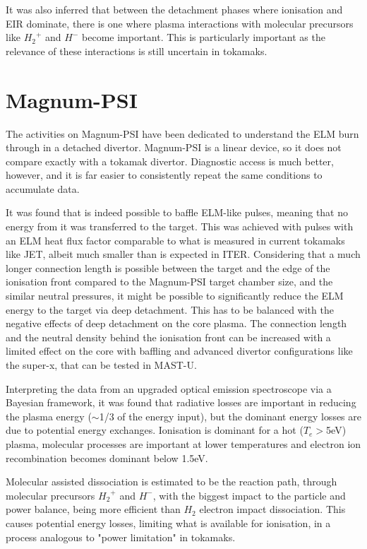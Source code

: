 It was also inferred that between the detachment phases where ionisation and EIR dominate, there is one where plasma interactions with molecular precursors like ${H_2}^+$ and $H^-$ become important. This is particularly important as the relevance of these interactions is still uncertain in tokamaks.


\section{Magnum-PSI}

The activities on Magnum-PSI have been dedicated to understand the ELM burn through in a detached divertor. Magnum-PSI is a linear device, so it does not compare exactly with a tokamak divertor.  Diagnostic access is much better, however, and it is far easier to consistently repeat the same conditions to accumulate data.

It was found that is indeed possible to baffle ELM-like pulses, meaning that no energy from it was transferred to the target. This was achieved with pulses with an ELM heat flux factor comparable to what is measured in current tokamaks like JET, albeit much smaller than is expected in ITER. Considering that a much longer connection length is possible between the target and the edge of the ionisation front compared to the Magnum-PSI target chamber size, and the similar neutral pressures, it might be possible to significantly reduce the ELM energy to the target via deep detachment. This has to be balanced with the negative effects of deep detachment on the core plasma. The connection length and the neutral density behind the ionisation front can be increased with a limited effect on the core with baffling and advanced divertor configurations like the super-x, that can be tested in MAST-U.

Interpreting the data from an upgraded optical emission spectroscope via a Bayesian framework, it was found that radiative losses are important in reducing the plasma energy ($\sim$1/3 of the energy input), but the dominant energy losses are due to potential energy exchanges. Ionisation is dominant for a hot ($T_e>$5eV) plasma, molecular processes are important at lower temperatures and electron ion recombination becomes dominant below 1.5eV.

Molecular assisted dissociation is estimated to be the reaction path, through molecular precursors ${H_2}^+$ and $H^-$, with the biggest impact to the particle and power balance, being more efficient than ${H_2}$ electron impact dissociation. This causes potential energy losses, limiting what is available for ionisation, in a process analogous to "power limitation" in tokamaks.

